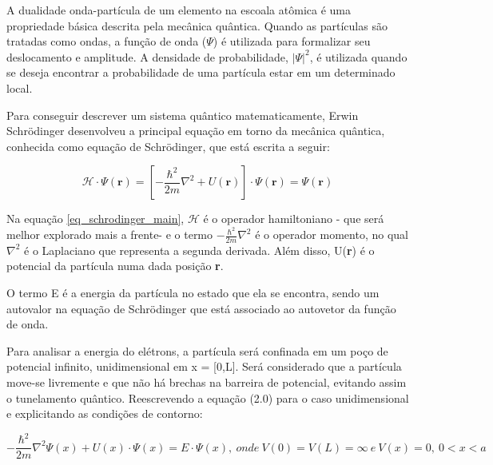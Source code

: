 \par A dualidade onda-partícula de um elemento na escoala atômica é uma propriedade básica descrita pela mecânica quântica\cite{qm_fis3}. Quando as partículas são tratadas como ondas, a função de onda ($\Psi$) é utilizada para formalizar seu deslocamento e amplitude\cite{qm_fis4}. A densidade de probabilidade, $\left| \Psi \right|^2$, é utilizada quando se deseja encontrar a probabilidade de uma partícula estar em um determinado local.

    \par Para conseguir descrever um sistema quântico matematicamente, Erwin Schrödinger desenvolveu a principal equação em torno da mecânica quântica, conhecida como equação de Schrödinger, que está escrita a seguir:

    \begin{equation}\label{eq_schrodinger_main}
      \mathcal{H} \cdot \Psi(\mathbf{r}) = \left[ -\frac{\hbar^2}{2m}\nabla^2 + U(\textbf{r}) \right] \cdot \Psi(\mathbf{r}) = \Psi(\mathbf{r})
    \end{equation}

    \par Na equação \eqref{eq_schrodinger_main}, $\mathcal{H}$ é o operador hamiltoniano - que será melhor explorado mais a frente- e o termo $ -\frac{\hbar^2}{2m}\nabla^2 $ é o operador momento, no qual $\nabla^2$ é o Laplaciano que representa a segunda derivada. Além disso, U(\textbf{r}) é o potencial da partícula numa dada posição \textbf{r}.

    \par O termo E é a energia da partícula no estado que ela se encontra, sendo um autovalor na equação de Schrödinger que está associado ao autovetor da função de onda.

    \par Para analisar a energia do elétrons, a partícula será confinada em um poço de potencial infinito, unidimensional em x = [0,L]. Será considerado que a partícula move-se livremente e que não há brechas na barreira de potencial, evitando assim o tunelamento quântico. Reescrevendo a equação (2.0) para o caso unidimensional e explicitando as condições de contorno:

    \begin{equation}\label{eq_schrodinger_frustrado}
      -\frac{\hbar^2}{2m} \nabla^2 \Psi(x) + U(x) \cdot \Psi(x) = E \cdot \Psi(x),
      \ onde\ V(0)=V(L)=\infty\ e\ V(x)=0,\ 0<x<a
    \end{equation}

